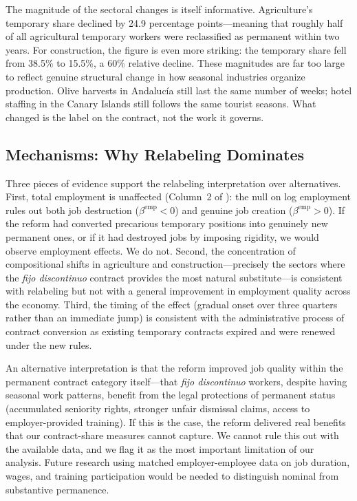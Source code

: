 \documentclass[12pt]{article}
\begin{document}
The magnitude of the sectoral changes is itself informative. Agriculture's temporary share declined by 24.9 percentage points---meaning that roughly half of all agricultural temporary workers were reclassified as permanent within two years. For construction, the figure is even more striking: the temporary share fell from 38.5\% to 15.5\%, a 60\% relative decline. These magnitudes are far too large to reflect genuine structural change in how seasonal industries organize production. Olive harvests in Andaluc\'{i}a still last the same number of weeks; hotel staffing in the Canary Islands still follows the same tourist seasons. What changed is the label on the contract, not the work it governs.

\subsection{Mechanisms: Why Relabeling Dominates}

Three pieces of evidence support the relabeling interpretation over alternatives. First, total employment is unaffected (Column~2 of ): the null on log employment rules out both job destruction ($\beta^{\text{emp}} < 0$) and genuine job creation ($\beta^{\text{emp}} > 0$). If the reform had converted precarious temporary positions into genuinely new permanent ones, or if it had destroyed jobs by imposing rigidity, we would observe employment effects. We do not. Second, the concentration of compositional shifts in agriculture and construction---precisely the sectors where the \emph{fijo discontinuo} contract provides the most natural substitute---is consistent with relabeling but not with a general improvement in employment quality across the economy. Third, the timing of the effect (gradual onset over three quarters rather than an immediate jump) is consistent with the administrative process of contract conversion as existing temporary contracts expired and were renewed under the new rules.

An alternative interpretation is that the reform improved job quality within the permanent contract category itself---that \emph{fijo discontinuo} workers, despite having seasonal work patterns, benefit from the legal protections of permanent status (accumulated seniority rights, stronger unfair dismissal claims, access to employer-provided training). If this is the case, the reform delivered real benefits that our contract-share measures cannot capture. We cannot rule this out with the available data, and we flag it as the most important limitation of our analysis. Future research using matched employer-employee data on job duration, wages, and training participation would be needed to distinguish nominal from substantive permanence.
\end{document}
